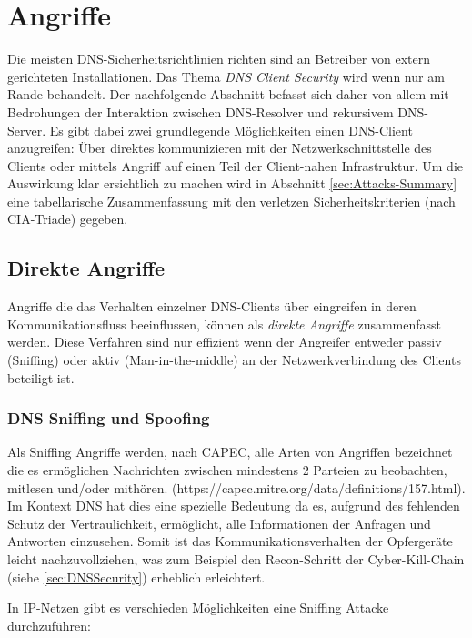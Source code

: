 \chapter{Angriffe}
\label{sec:Attacks}

Die meisten DNS-Sicherheitsrichtlinien richten sind an Betreiber von extern gerichteten Installationen. Das Thema \textit{DNS Client Security} wird wenn nur am Rande behandelt. Der nachfolgende Abschnitt befasst sich daher von allem mit Bedrohungen der Interaktion zwischen DNS-Resolver und rekursivem DNS-Server. 
Es gibt dabei zwei grundlegende Möglichkeiten einen DNS-Client anzugreifen: Über direktes kommunizieren mit der Netzwerkschnittstelle des Clients oder mittels Angriff auf einen Teil der Client-nahen Infrastruktur. Um die Auswirkung klar ersichtlich zu machen wird in Abschnitt \ref{sec:Attacks-Summary} eine tabellarische Zusammenfassung mit den verletzen Sicherheitskriterien (nach CIA-Triade) gegeben. 


\section{Direkte Angriffe}

Angriffe die das Verhalten einzelner DNS-Clients über eingreifen in deren Kommunikationsfluss beeinflussen, können als \textit{direkte Angriffe} zusammenfasst werden. Diese Verfahren sind nur effizient wenn der Angreifer entweder passiv (Sniffing) oder aktiv (Man-in-the-middle) an der Netzwerkverbindung des Clients beteiligt ist. 

\subsection{DNS Sniffing und Spoofing}

Als Sniffing Angriffe werden, nach CAPEC, alle Arten von Angriffen bezeichnet die es ermöglichen Nachrichten zwischen mindestens 2 Parteien zu beobachten, mitlesen und/oder mithören. (https://capec.mitre.org/data/definitions/157.html). Im Kontext DNS hat dies eine spezielle Bedeutung da es, aufgrund des fehlenden Schutz der Vertraulichkeit, ermöglicht, alle Informationen der Anfragen und Antworten einzusehen. Somit ist das Kommunikationsverhalten der Opfergeräte leicht nachzuvollziehen, was zum Beispiel den Recon-Schritt der Cyber-Kill-Chain (siehe \ref{sec:DNSSecurity}) erheblich erleichtert. 

In IP-Netzen gibt es verschieden Möglichkeiten eine Sniffing Attacke durchzuführen: 

